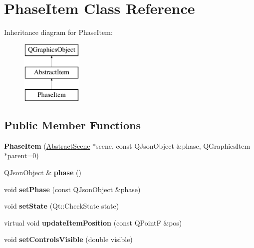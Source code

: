 \hypertarget{class_phase_item}{\section{Phase\-Item Class Reference}
\label{class_phase_item}
}
Inheritance diagram for Phase\-Item\-:\begin{figure}[H]
\begin{center}
\leavevmode
\includegraphics[height=3.000000cm]{class_phase_item}
\end{center}
\end{figure}
\subsection*{Public Member Functions}
\begin{DoxyCompactItemize}
\item 
\hypertarget{class_phase_item_aabdc1a13e81be7918a36ca3deb473ab5}{{\bfseries Phase\-Item} (\hyperlink{class_abstract_scene}{Abstract\-Scene} $\ast$scene, const Q\-Json\-Object \&phase, Q\-Graphics\-Item $\ast$parent=0)}\label{class_phase_item_aabdc1a13e81be7918a36ca3deb473ab5}

\item 
\hypertarget{class_phase_item_a7383a7ed428b19e1741e780dfbf8e522}{Q\-Json\-Object \& {\bfseries phase} ()}\label{class_phase_item_a7383a7ed428b19e1741e780dfbf8e522}

\item 
\hypertarget{class_phase_item_a7a5b58e30a82e2475bcc05556deeca21}{void {\bfseries set\-Phase} (const Q\-Json\-Object \&phase)}\label{class_phase_item_a7a5b58e30a82e2475bcc05556deeca21}

\item 
\hypertarget{class_phase_item_a11317cec7320c79630f5144ea8b43088}{void {\bfseries set\-State} (Qt\-::\-Check\-State state)}\label{class_phase_item_a11317cec7320c79630f5144ea8b43088}

\item 
\hypertarget{class_phase_item_ae218987f9091009291aa9a181e6e29ad}{virtual void {\bfseries update\-Item\-Position} (const Q\-Point\-F \&pos)}\label{class_phase_item_ae218987f9091009291aa9a181e6e29ad}

\item 
\hypertarget{class_phase_item_a4b911bd4170f7b142b301171bfb43c68}{void {\bfseries set\-Controls\-Visible} (double visible)}\label{class_phase_item_a4b911bd4170f7b142b301171bfb43c68}

\end{DoxyCompactItemize}
